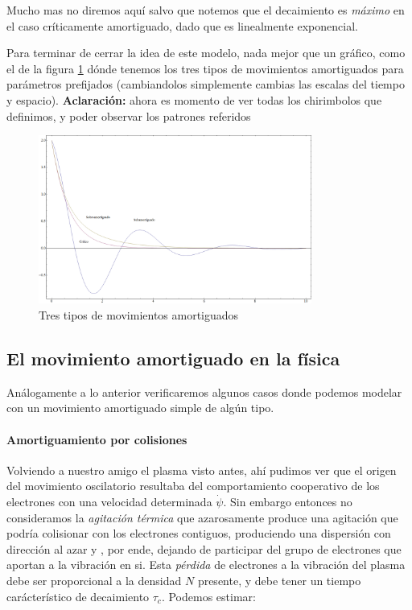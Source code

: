 \documentclass[a4paper,spanish]{article}
\numberwithin{equation}{section}
\begin{document}
Mucho mas no diremos aqu\'i salvo que notemos que el decaimiento es \textit{m\'aximo} en el caso cr\'iticamente amortiguado, dado que es linealmente exponencial.

Para terminar de cerrar la idea de este modelo, nada mejor que un gr\'afico, como el de la figura \ref{fig:oscilador_amortiguado} d\'onde tenemos los tres tipos de movimientos amortiguados para par\'ametros prefijados (cambiandolos simplemente cambias las escalas del tiempo y espacio). \textbf{Aclaración:} ahora es momento de ver todas los chirimbolos que definimos, y poder observar los patrones referidos

\begin{figure}[H]
  \centering
  \includegraphics[width=0.8\textwidth]{Imagenes/amortiguado.png}
  \caption{Tres tipos de movimientos amortiguados}
  \label{fig:oscilador_amortiguado}
\end{figure}

\subsection{El movimiento amortiguado en la f\'isica}

An\'alogamente a lo anterior verificaremos algunos casos donde podemos modelar con un movimiento amortiguado simple de alg\'un tipo.	

\paragraph{Amortiguamiento por colisiones}
Volviendo a nuestro amigo el plasma visto antes, ah\'i pudimos ver que el origen del movimiento oscilatorio resultaba del comportamiento cooperativo de los electrones con una velocidad determinada $\dot{\psi}$. Sin embargo entonces no consideramos la \textit{agitaci\'on t\'ermica} que azarosamente produce una agitaci\'on que podr\'ia colisionar con los electrones contiguos, produciendo una dispersi\'on con direcci\'on al azar y , por ende, dejando de participar del grupo de electrones que aportan a la vibraci\'on en si. Esta \textit{p\'erdida} de electrones a la vibraci\'on del plasma debe ser proporcional a la densidad $N$ presente, y debe tener un tiempo car\'acter\'istico de decaimiento $\tau_c$. Podemos estimar:
\end{document}
